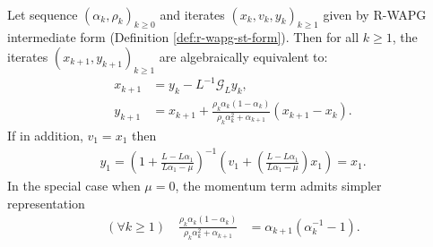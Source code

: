\documentclass[12pt]{article}
\begin{document}
        \begin{proposition}\label{prop:r-wapg-momentum-repr}
            \;\\
            Let sequence $(\alpha_k, \rho_k)_{k \ge 0}$ and iterates $(x_k, v_k, y_k)_{k\ge 1}$ given by R-WAPG intermediate form (Definition \ref{def:r-wapg-st-form}). 
            Then for all $k \ge 1$, the iterates $(x_{k + 1}, y_{k + 1})_{k \ge 1}$ are algebraically equivalent to: 
            \begin{align*}
                x_{k + 1} &= y_k - L^{-1}\mathcal G_Ly_k, 
                \\
                y_{k + 1} &= 
                x_{k + 1} + 
                \frac{\rho_k\alpha_k(1 - \alpha_k)}
                {\rho_k\alpha_k^2 + \alpha_{k + 1}}(x_{k + 1} - x_k). 
            \end{align*}
            If in addition, $v_1 = x_1$ then 
            \begin{align*}
                y_1 = \left(
                    1 + \frac{L - L \alpha_1}{L\alpha_1 - \mu}
                \right)^{-1}\left(
                    v_1 + \left(
                        \frac{L - L \alpha_1}{L \alpha_1 - \mu}
                    \right)x_1
                \right) = x_1. 
            \end{align*}
            In the special case when $\mu = 0$, the momentum term admits simpler representation 
            \begin{align*}
                (\forall k \ge 1) \quad 
                \frac{\rho_k\alpha_k(1 - \alpha_k)}{\rho_k\alpha_k^2 + \alpha_{k + 1}}
                & = \alpha_{k + 1}(\alpha_k^{-1} - 1). 
            \end{align*}
        \end{proposition}
\end{document}
